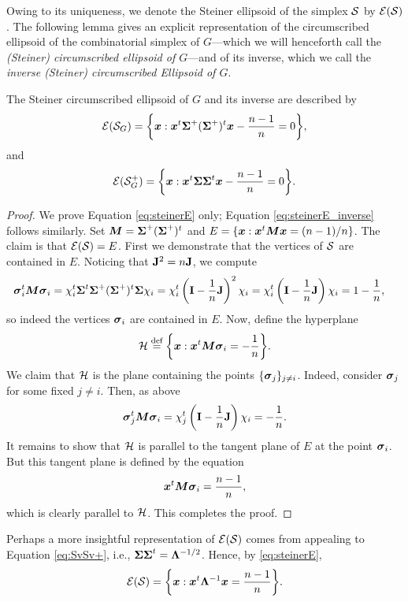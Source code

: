 Owing to its uniqueness, we denote the Steiner ellipsoid of the simplex $\mathcal{S}$ by $\mathcal{E}(\mathcal{S})$. The following lemma gives an explicit representation of the circumscribed ellipsoid of the combinatorial simplex of $G$---which we will  henceforth call the \emph{(Steiner) circumscribed ellipsoid of $G$}---and of its inverse, which we call the \emph{inverse (Steiner) circumscribed Ellipsoid of $G$}. 

\begin{lemma}
	\label{lem:El(S)}
The Steiner circumscribed ellipsoid  of $G$ and its inverse  are described by 
\begin{equation}
\label{eq:steinerE}
    \mathcal{E}(\mathcal{S}_G) = \bigg\{\vb*{x}: \vb*{x}^t \boldsymbol{\Sigma}^+(\boldsymbol{\Sigma}^+)^t \vb*{x} - \frac{n-1}{n}=0\bigg\},
\end{equation}
and 
\begin{equation}
\label{eq:steinerE_inverse}
\mathcal{E}(\mathcal{S}^+_G) = \bigg\{\vb*{x}: \vb*{x}^t \boldsymbol{\Sigma}\boldsymbol{\Sigma}^t \vb*{x} - \frac{n-1}{n}=0\bigg\}.
\end{equation}
\end{lemma}
\begin{proof}
We prove Equation  \eqref{eq:steinerE} only; Equation \eqref{eq:steinerE_inverse} follows similarly. 
Set ${\vb*{M}}=\boldsymbol{\Sigma}^+(\boldsymbol{\Sigma}^+)^t$ and $E=\{\vb*{x}:\vb*{x}^t {\vb*{M}}\vb*{x}=(n-1)/n\}$. The claim is that $\mathcal{E}(\mathcal{S})=E$.  
First we demonstrate that the vertices of $\mathcal{S}$ are contained in $E$. Noticing that $\vb{J}^2=n\vb{J}$, we compute 
\begin{align*}
    \vb*{\sigma}_i^t {\vb*{M}} \vb*{\sigma}_i &= \chi_i^t \boldsymbol{\Sigma}^t \boldsymbol{\Sigma}^+(\boldsymbol{\Sigma}^+)^t \boldsymbol{\Sigma} \chi_i = \chi_i^t \left(\vb{I}-\frac{1}{n}\vb{J}\right)^2 \chi_i = \chi_i^t \left(\vb{I}-\frac{1}{n}\vb{J}\right) \chi_i = 1 - \frac{1}{n}, 
\end{align*}
so indeed the vertices $\vb*{\sigma}_i$ are contained in $E$. Now, define the hyperplane 
\[\mathcal{H}\overset{\text{def}}{=} \bigg\{\vb*{x}:\vb*{x}^t {\vb*{M}} \vb*{\sigma}_i = -\frac{1}{n}\bigg\}.\]
We claim that $\mathcal{H}$ is the plane containing the points $\{\vb*{\sigma}_j\}_{j\neq i}$. Indeed, consider $\vb*{\sigma}_j$ for some fixed $j\neq i$. Then, as above 
\[\vb*{\sigma}_j^t {\vb*{M}}\vb*{\sigma}_i = \chi_j^t \left(\vb{I}-\frac{1}{n}\vb{J}\right) \chi_i = -\frac{1}{n}. \]
It remains to show that $\mathcal{H}$ is parallel to the tangent plane of $E$ at the point $\vb*{\sigma}_i$. But this tangent plane is defined by the equation~\cite{fiedler2005geometry} 
\[\vb*{x}^t {\vb*{M}}\vb*{\sigma}_i =\frac{n-1}{n},\]
which is clearly parallel to $\mathcal{H}$. This completes the proof.
\end{proof}

 Perhaps a more insightful representation of $\mathcal{E}(\mathcal{S})$ comes from appealing to Equation \eqref{eq:SvSv+}, i.e., $\boldsymbol{\Sigma}\boldsymbol{\Sigma}^t = \vb{\Lambda}^{-1/2}$. Hence, by \eqref{eq:steinerE},
\begin{equation}
\label{eq:steinerE2}
    \mathcal{E}(\mathcal{S}) = \bigg\{\vb*{x}:\vb*{x}^t \vb{\Lambda}^{-1}\vb*{x} = \frac{n-1}{n}\bigg\}.
\end{equation}

